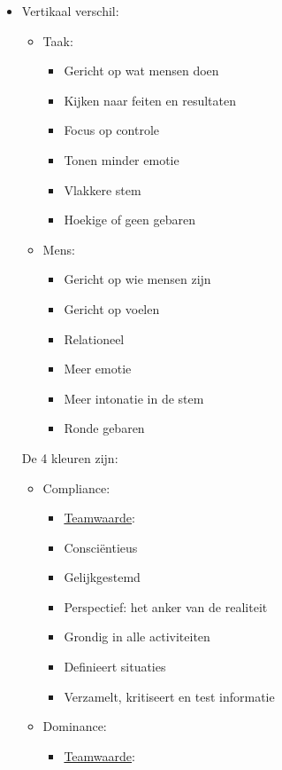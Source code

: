 \documentclass[12pt]{article}
\begin{document}
\begin{itemize}
\begin{itemize}
        \item[]Vertikaal verschil:\begin{itemize}
            \item Taak:\begin{itemize}
                \item Gericht op wat mensen doen
                \item Kijken naar feiten en resultaten 
                \item Focus op controle 
                \item Tonen minder emotie 
                \item Vlakkere stem 
                \item Hoekige of geen gebaren
            \end{itemize}
            \item Mens:\begin{itemize}
                \item Gericht op wie mensen zijn
                \item Gericht op voelen 
                \item Relationeel 
                \item Meer emotie
                \item Meer intonatie in de stem
                \item Ronde gebaren
            \end{itemize}
        \end{itemize}
        De 4 kleuren zijn:\begin{itemize}
            \item Compliance:\begin{itemize}
                \item[]\underline{Teamwaarde}:
                    \item Consciëntieus
                    \item Gelijkgestemd
                    \item Perspectief: het anker van de realiteit 
                    \item Grondig in alle activiteiten 
                    \item Definieert situaties 
                    \item Verzamelt, kritiseert en test informatie
            \end{itemize}
            \item Dominance:\begin{itemize}
                \item[]\underline{Teamwaarde}:

\end{itemize}
\end{itemize}
\end{itemize}
\end{itemize}
\end{document}
